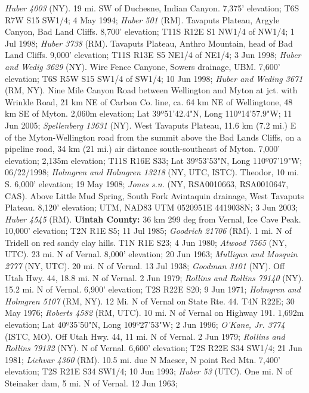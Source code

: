 \textit{Huber 4003} (NY).
19 mi. SW of Duchesne, Indian Canyon. 7,375' elevation; T6S R7W S15 SW1/4;
4 May 1994; \textit{Huber 501} (RM).
Tavaputs Plateau, Argyle Canyon, Bad Land Cliffs. 8,700' elevation;
T11S R12E S1 NW1/4 of NW1/4; 1 Jul 1998; \textit{Huber 3738} (RM).
Tavaputs Plateau, Anthro Mountain, head of Bad Land Cliffs. 9,000' elevation;
T11S R13E S5 NE1/4 of NE1/4; 3 Jun 1998; \textit{Huber and Wedig 3629} (NY).
Wire Fence Canyone, Sowers drainage, UBM. 7,600' elevation;
T6S R5W S15 SW1/4 of SW1/4; 10 Jun 1998; \textit{Huber and Weding 3671} (RM, NY).
Nine Mile Canyon Road between Wellington and Myton at jct. with Wrinkle Road,
21 km NE of Carbon Co. line, ca. 64 km NE of Wellingtone, 48 km SE of Myton.
2,060m elevation; Lat 39º51'42.4"N, Long 110º14'57.9"W; 11 Jun 2005;
\textit{Spellenberg 13631} (NY).
West Tavaputs Plateau, 11.6 km (7.2 mi.) E of the Myton-Wellington road from the
summit above the Bad Lands Cliffs, on a pipeline road, 34 km (21 mi.) air
distance south-southeast of Myton. 7,000' elevation; 2,135m elevation;
T11S R16E S33; Lat 39º53'53"N, Long 110º07'19"W; 06/22/1998;
\textit{Holmgren and Holmgren 13218} (NY, UTC, ISTC).
Theodor, 10 mi. S. 6,000' elevation; 19 May 1908;
\textit{Jones s.n.} (NY, RSA0010663, RSA0010647, CAS).
Above Little Mud Spring, South Fork Avintaquin drainage, West Tavaputs Plateau.
8,120' elevation; UTM, NAD83 UTM 0520951E 4419038N; 3 Jun 2003;
\textit{Huber 4545} (RM).
  \textbf{Uintah County:}
36 km 299 deg from Vernal, Ice Cave Peak. 10,000' elevation; T2N R1E S5;
11 Jul 1985; \textit{Goodrich 21706} (RM).
1 mi. N of Tridell on red sandy clay hills. T1N R1E S23; 4 Jun 1980;
\textit{Atwood 7565} (NY, UTC).
23 mi. N of Vernal. 8,000' elevation; 20 Jun 1963;
\textit{Mulligan and Mosquin 2777} (NY, UTC).
20 mi. N of Vernal. 13 Jul 1938; \textit{Goodman 3101} (NY).
Off Utah Hwy. 44, 18.8 mi. N of Vernal. 2 Jun 1979;
\textit{Rollins and Rollins 79140} (NY).
15.2 mi. N of Vernal. 6,900' elevation; T2S R22E S20; 9 Jun 1971;
\textit{Holmgren and Holmgren 5107} (RM, NY).
12 Mi. N of Vernal on State Rte. 44. T4N R22E; 30 May 1976;
\textit{Roberts 4582} (RM, UTC).
10 mi. N of Vernal on Highway 191. 1,692m elevation;
Lat 40º35'50"N, Long 109º27'53"W; 2 Jun 1996;
\textit{O'Kane, Jr. 3774} (ISTC, MO).
Off Utah Hwy. 44, 11 mi. N of Vernal. 2 Jun 1979;
\textit{Rollins and Rollins 79132} (NY).
N of Vernal. 6,600' elevation; T2S R22E S34 SW1/4; 21 Jun 1981;
\textit{Lichvar 4360} (RM).
10.5 mi. due N Maeser, N point Red Mtn. 7,400' elevation; T2S R21E S34 SW1/4;
10 Jun 1993; \textit{Huber 53} (UTC).
One mi. N of Steinaker dam, 5 mi. N of Vernal. 12 Jun 1963;
